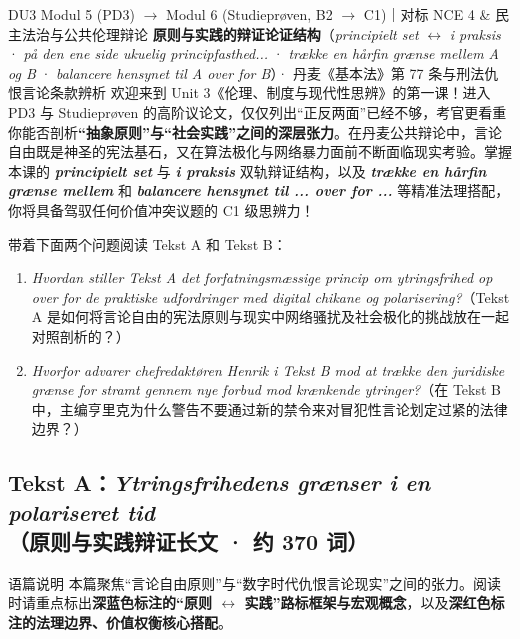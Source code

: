 {DU3 Modul 5 (PD3) $\rightarrow$ Modul 6 (Studieprøven, B2 $\rightarrow$ C1)｜对标 NCE 4 \& 民主法治与公共伦理辩论}
{\textbf{原则与实践的辩证论证结构}（\textit{principielt set} $\leftrightarrow$ \textit{i praksis} · \textit{på den ene side ukuelig principfasthed...} · \textit{trække en hårfin grænse mellem A og B} · \textit{balancere hensynet til A over for B}）· 丹麦《基本法》第 77 条与刑法仇恨言论条款辨析}
{欢迎来到 Unit 3《伦理、制度与现代性思辨》的第一课！进入 PD3 与 Studieprøven 的高阶议论文，仅仅列出“正反两面”已经不够，考官更看重你能否剖析\textbf{“抽象原则”与“社会实践”之间的深层张力}。在丹麦公共辩论中，言论自由既是神圣的宪法基石，又在算法极化与网络暴力面前不断面临现实考验。掌握本课的 \textbf{\textit{principielt set}} 与 \textbf{\textit{i praksis}} 双轨辩证结构，以及 \textbf{\textit{trække en hårfin grænse mellem}} 和 \textbf{\textit{balancere hensynet til ... over for ...}} 等精准法理搭配，你将具备驾驭任何价值冲突议题的 C1 级思辨力！}

\begin{foerduleaeser}
带着下面两个问题阅读 Tekst A 和 Tekst B：
\begin{enumerate}
  \item \textit{Hvordan stiller Tekst A det forfatningsmæssige princip om ytringsfrihed op over for de praktiske udfordringer med digital chikane og polarisering?}（Tekst A 是如何将言论自由的宪法原则与现实中网络骚扰及社会极化的挑战放在一起对照剖析的？）
  \item \textit{Hvorfor advarer chefredaktøren Henrik i Tekst B mod at trække den juridiske grænse for stramt gennem nye forbud mod krænkende ytringer?}（在 Tekst B 中，主编亨里克为什么警告不要通过新的禁令来对冒犯性言论划定过紧的法律边界？）
\end{enumerate}
\end{foerduleaeser}


\subsection*{Tekst A：\textit{Ytringsfrihedens grænser i en polariseret tid}（原则与实践辩证长文 · 约 370 词）}

\begin{tipbox}{语篇说明}
本篇聚焦“言论自由原则”与“数字时代仇恨言论现实”之间的张力。阅读时请重点标出\textbf{\color{NCDNavy}深蓝色标注的“原则 $\leftrightarrow$ 实践”路标框架与宏观概念}，以及\textbf{\color{NCDRed}深红色标注的法理边界、价值权衡核心搭配}。
\end{tipbox}

